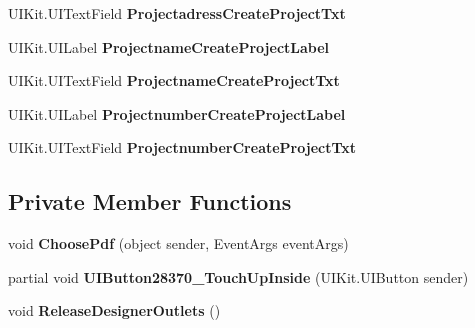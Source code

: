 \begin{DoxyCompactItemize}
U\+I\+Kit.\+U\+I\+Text\+Field {\bfseries Projectadress\+Create\+Project\+Txt}
\item 
\mbox{\label{class_ramboell_1_1i_o_s_1_1_create_project_view_controller_ae04af7506d0b28b97684b20e86eee003}} 
U\+I\+Kit.\+U\+I\+Label {\bfseries Projectname\+Create\+Project\+Label}
\item 
\mbox{\label{class_ramboell_1_1i_o_s_1_1_create_project_view_controller_a5f4211267278fd07d1c87e80e44b0438}} 
U\+I\+Kit.\+U\+I\+Text\+Field {\bfseries Projectname\+Create\+Project\+Txt}
\item 
\mbox{\label{class_ramboell_1_1i_o_s_1_1_create_project_view_controller_adc7af6ab26c913a163a990e30ba532ab}} 
U\+I\+Kit.\+U\+I\+Label {\bfseries Projectnumber\+Create\+Project\+Label}
\item 
\mbox{\label{class_ramboell_1_1i_o_s_1_1_create_project_view_controller_a465ea6dd697c6ad141a5649e73673d62}} 
U\+I\+Kit.\+U\+I\+Text\+Field {\bfseries Projectnumber\+Create\+Project\+Txt}
\end{DoxyCompactItemize}
\subsection*{Private Member Functions}
\begin{DoxyCompactItemize}
\item 
\mbox{\label{class_ramboell_1_1i_o_s_1_1_create_project_view_controller_a7af2163277251b02993d20bf1303de5b}} 
void {\bfseries Choose\+Pdf} (object sender, Event\+Args event\+Args)
\item 
\mbox{\label{class_ramboell_1_1i_o_s_1_1_create_project_view_controller_a75be9c725e6e1ab766a459773b7e724f}} 
partial void {\bfseries U\+I\+Button28370\+\_\+\+Touch\+Up\+Inside} (U\+I\+Kit.\+U\+I\+Button sender)
\item 
\mbox{\label{class_ramboell_1_1i_o_s_1_1_create_project_view_controller_a4ccb377b17071383464bbea9284e4d0d}} 
void {\bfseries Release\+Designer\+Outlets} ()
\end{DoxyCompactItemize}


